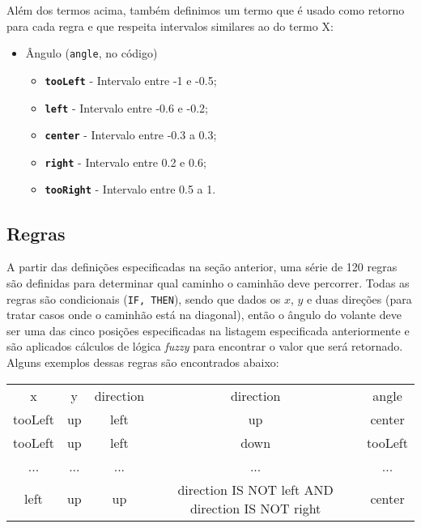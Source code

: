 \documentclass{article}
\begin{document}
        Além dos termos acima, também definimos um termo que é usado como
        retorno para cada regra e que respeita intervalos similares ao do termo
        X:
        
        \begin{itemize}
            \item Ângulo (\texttt{angle}, no código)
            \begin{itemize}
                    \item \texttt{\textbf{tooLeft}} - Intervalo entre -1 e -0.5;
                    \item \texttt{\textbf{left}} - Intervalo entre -0.6 e -0.2;
                    \item \texttt{\textbf{center}} - Intervalo entre -0.3 a 0.3;
                    \item \texttt{\textbf{right}} - Intervalo entre 0.2 e 0.6;
                    \item \texttt{\textbf{tooRight}} - Intervalo entre 0.5 a 1.
            \end{itemize}
        \end{itemize}
    
    \subsection*{Regras}
        A partir das definições especificadas na seção anterior, uma série de
        120 regras são definidas para determinar qual caminho o caminhão deve
        percorrer. Todas as regras são condicionais (\texttt{IF, THEN}), sendo
        que dados os $x$, $y$ e duas direções (para tratar casos onde o
        caminhão está na diagonal), então o ângulo do volante deve ser uma das
        cinco posições especificadas na listagem especificada anteriormente e
        são aplicados cálculos de lógica \textit{fuzzy} para encontrar o valor
        que será retornado. Alguns exemplos dessas regras são encontrados
        abaixo:
        
        \begin{tabular}{c c c c c}
            \hline
             x & y & direction & direction & angle \\
             tooLeft & up & left & up & center \\
             tooLeft & up & left & down & tooLeft \\
             ... & ... & ... & ... & ... \\
             left & up & up & direction IS NOT left AND direction IS NOT right & center \\
             
            \hline
        \end{tabular}
        
\end{document}
